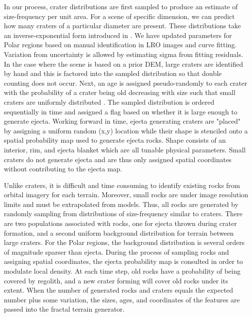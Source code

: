 \documentclass[twocolumn,letterpaper]{IEEEAerospaceCLS}  %
\begin{document}
In our process, crater distributions are first sampled to produce an estimate of size-frequency per unit area.  
For a scene of specific dimension, we can predict how many craters of a particular diameter are present.  
These distributions take an inverse-exponential form introduced in \cite{Surveyor1968}.  
We have updated parameters for Polar regions based on manual identification in LRO images and curve fitting.  
Variation from uncertainty is allowed by estimating sigma from fitting residuals.  
In the case where the scene is based on a prior DEM, large craters are identified by hand and this is factored into the sampled distribution so that double counting does not occur.  
Next, an age is assigned pseudo-randomly to each crater with the probability of a crater being old decreasing with size such that small craters are uniformly distributed \cite{Fassett2014}.  
The sampled distribution is ordered sequentially in time and assigned a flag based on whether it is large enough to generate ejecta.  
Working forward in time, ejecta generating craters are "placed" by assigning a uniform random (x,y) location while their shape is stenciled onto a spatial probability map used to generate ejecta rocks.  
Shape consists of an interior, rim, and ejecta blanket which are all tunable physical parameters.  
Small craters do not generate ejecta and are thus only assigned spatial coordinates without contributing to the ejecta map.

Unlike craters, it is difficult and time consuming to identify existing rocks from orbital imagery for each terrain.  
Moreover, small rocks are under image resolution limits and must be extrapolated from models.  
Thus, all rocks are generated by randomly sampling from distributions of size-frequency similar to craters.  
There are two populations associated with rocks, one for ejecta thrown during crater formation, and a second uniform background distribution for terrain between large craters.  
For the Polar regions, the background distribution is several orders of magnitude sparser than ejecta.  
During the process of sampling rocks and assigning spatial coordinates, the ejecta probability map is consulted in order to modulate local density.  
At each time step, old rocks have a probability of being covered by regolith, and a new crater forming will cover old rocks under its extent.  
When the number of generated rocks and craters equals the expected number plus some variation, the sizes, ages, and coordinates of the features are passed into the fractal terrain generator.
\end{document}
